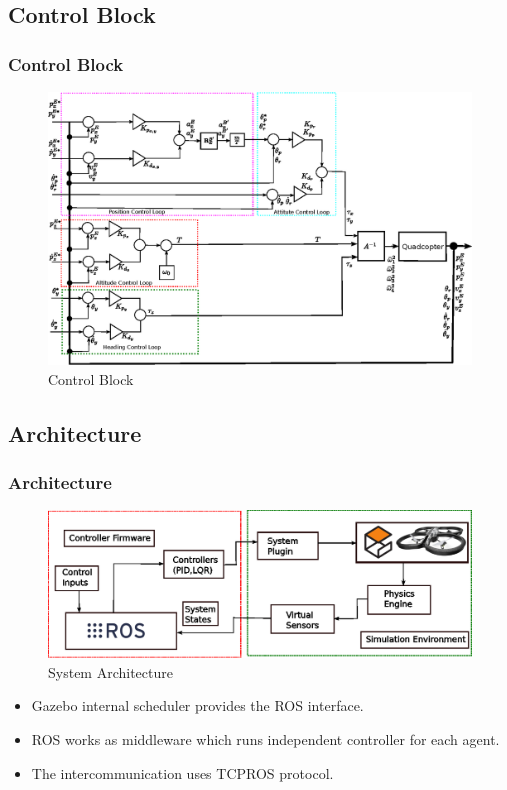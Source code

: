 \documentclass[10pt]{beamer}
\begin{document}
\subsection*{Control Block}
\begin{frame}
	\frametitle{Control Block}
	\begin{figure}[h!]
		\centering
		\includegraphics[scale=0.6]{Control-block.eps}
		\caption{Control Block}
		\label{Fig:Control Block}
	\end{figure}
\end{frame}

\subsection*{Architecture}
\begin{frame}
	\frametitle{Architecture}
	\begin{figure}[h!]
		\centering
		\includegraphics[scale=0.8]{System-architecture.eps}
		\caption{System Architecture}
		\label{Fig:System Architecture}
	\end{figure}
	\begin{itemize}
		\item Gazebo internal scheduler provides the ROS interface.
		\item ROS works as middleware which runs independent controller for each agent.
		\item The intercommunication uses TCPROS protocol.
	\end{itemize}
\end{frame}
\end{document}
